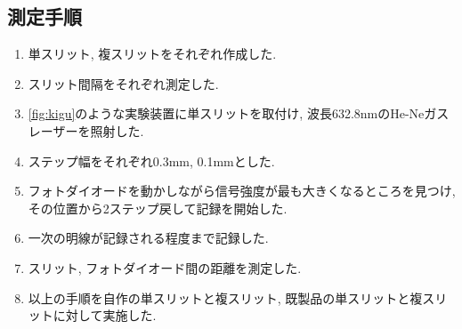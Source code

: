 \documentclass[11pt]{ltjsarticle}
\begin{document}
    \subsection*{測定手順}
    \begin{enumerate}
      \item 単スリット, 複スリットをそれぞれ作成した.
      \item スリット間隔をそれぞれ測定した.
      \item \cref{fig:kigu}のような実験装置に単スリットを取付け, 波長632.8nmのHe-Neガスレーザーを照射した.
      \item ステップ幅をそれぞれ0.3mm, 0.1mmとした. 
      \item フォトダイオードを動かしながら信号強度が最も大きくなるところを見つけ, その位置から2ステップ戻して記録を開始した. 
      \item 一次の明線が記録される程度まで記録した. 
      \item スリット, フォトダイオード間の距離を測定した. 
      \item 以上の手順を自作の単スリットと複スリット, 既製品の単スリットと複スリットに対して実施した.
    \end{enumerate}
\end{document}
